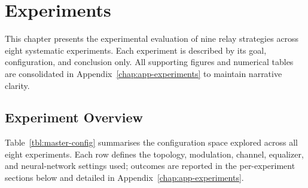 \chapter{Experiments}\label{sec:experiments}

This chapter presents the experimental evaluation of nine relay strategies across eight
systematic experiments. Each experiment is described by its goal, configuration, and
conclusion only. All supporting figures and numerical tables are consolidated in
Appendix~\ref{chap:app-experiments} to maintain narrative clarity.

\section{Experiment Overview}\label{sec:experiment-overview}

Table~\ref{tbl:master-config} summarises the configuration space explored across all
eight experiments. Each row defines the topology, modulation, channel, equalizer, and
neural-network settings used; outcomes are reported in the per-experiment sections below
and detailed in Appendix~\ref{chap:app-experiments}.

